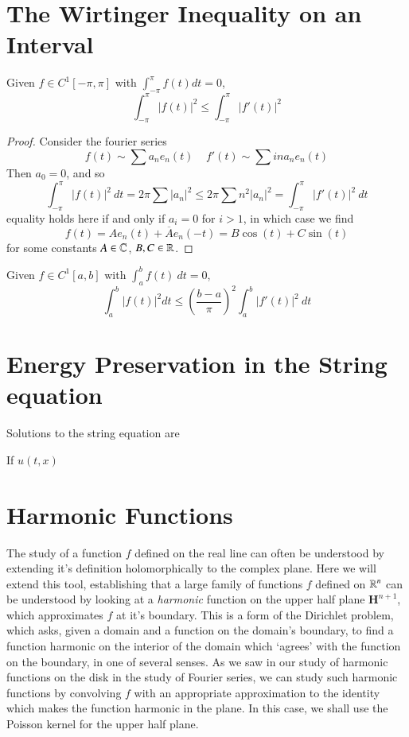 \section{The Wirtinger Inequality on an Interval}

\begin{theorem}
    Given $f \in C^1[-\pi,\pi]$ with $\int_{-\pi}^\pi f(t) dt = 0$,
    \[ \int_{-\pi}^\pi |f(t)|^2 \leq \int_{-\pi}^\pi |f'(t)|^2 \]
\end{theorem}
\begin{proof}
    Consider the fourier series
    \[ f(t) \sim \sum a_n e_n(t)\ \ \ \ \ f'(t) \sim \sum in a_n e_n(t) \]
    Then $a_0 = 0$, and so
    \[ \int_{-\pi}^\pi |f(t)|^2\ dt = 2 \pi \sum |a_n|^2 \leq 2 \pi \sum n^2 |a_n|^2 = \int_{-\pi}^\pi |f'(t)|^2\ dt \]
    equality holds here if and only if $a_i = 0$ for $i > 1$, in which case we find
    \[ f(t) = A e_n(t) + \overline{A} e_n(-t) = B \cos(t) + C \sin(t) \]
    for some constants $A \in \operatorname{\mathbb{C}}$, $B,C \in \operatorname{\mathbb{R}}$.
\end{proof}

\begin{corollary}
    Given $f \in C^1[a,b]$ with $\int_a^b f(t)\ dt = 0$,
    \[ \int_a^b |f(t)|^2 dt \leq \left(\frac{b-a}{\pi}\right)^2 \int_a^b |f'(t)|^2\ dt \]
\end{corollary}

\section{Energy Preservation in the String equation}

Solutions to the string equation are

If $u(t,x)$

\section{Harmonic Functions} 

The study of a function $f$ defined on the real line can often be understood by extending it's definition holomorphically to the complex plane. Here we will extend this tool, establishing that a large family of functions $f$ defined on $\operatorname{\mathbb{R}}^n$ can be understood by looking at a {\it harmonic} function on the upper half plane $\mathbf{H}^{n+1}$, which approximates $f$ at it's boundary. This is a form of the Dirichlet problem, which asks, given a domain and a function on the domain's boundary, to find a function harmonic on the interior of the domain which `agrees' with the function on the boundary, in one of several senses. As we saw in our study of harmonic functions on the disk in the study of Fourier series, we can study such harmonic functions by convolving $f$ with an appropriate approximation to the identity which makes the function harmonic in the plane. In this case, we shall use the Poisson kernel for the upper half plane.

